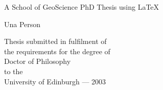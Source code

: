 \thispagestyle{empty}

\begin{minipage}{\textwidth}
\end{minipage}
\begin{center}
\vspace{2cm}
{ \Huge A School of GeoScience PhD Thesis using {\LaTeX} 
  \par
  \vspace{0.5cm} 
{\Large Una Person \par}
}
\end{center}
\vfill
\begin{center}
\vspace{6cm}    
\centerline{}
\vspace{0.5cm}
Thesis submitted in fulfilment of\\
the requirements for the degree of\\ 
Doctor of Philosophy\\ 
to the\\
University of Edinburgh --- 2003
\end{center}

\newpage
\thispagestyle{empty}


